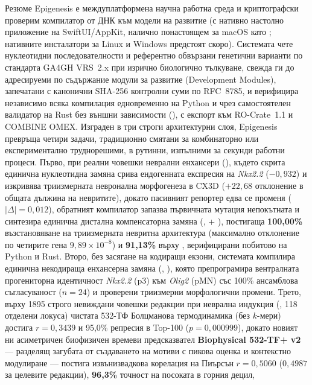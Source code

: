 \documentclass[10.5pt,a4paper]{article}
\begin{document}

\begin{abstractbox}{Резюме}
Epigenesis е междуплатформена научна работна среда и криптографски проверим компилатор от ДНК към модели на развитие (с нативно настолно приложение на SwiftUI/AppKit, налично понастоящем за macOS като ; нативните инсталатори за Linux и Windows предстоят скоро\texttrademark). Системата чете нуклеотидни последователности и референтно обвързани генетични варианти по стандарта GA4GH VRS~2.x при изрично биологично тълкуване, свежда ги до адресируеми по съдържание модули за развитие (Development Modules), запечатани с канонични SHA-256 контролни суми по RFC~8785, и верифицира независимо всяка компилация едновременно на Python и чрез самостоятелен валидатор на Rust без външни зависимости (), с експорт към RO-Crate~1.1 и COMBINE OMEX. Изграден в три строги архитектурни слоя, Epigenesis превръща четири задачи, традиционно смятани за комбинаторно или експериментално труднорешими, в рутинни, изпълними за секунди работни процеси. Първо, при реални човешки неврални енхансери (), където скрита единична нуклеотидна замяна срива ендогенната експресия на \emph{Nkx2.2} ($-0{,}932$) и изкривява триизмерната невронална морфогенеза в CX3D ($+22{,}68$ отклонение в общата дължина на невритите), докато пасивният репортер едва се променя ($|\Delta|=0{,}012$), обратният компилатор запазва първичната мутация непокътната и синтезира единична дистална компенсаторна замяна (,  + ), постигаща \textbf{100,00\%} възстановяване на триизмерната невритна архитектура (максимално отклонение по четирите гена $9{,}89\times10^{-8}$) и \textbf{91,13\%} върху , верифицирани побитово на Python и Rust. Второ, без засягане на кодиращи екзони, системата компилира единична некодираща енхансерна замяна (, ), която препрограмира вентралната прогениторна идентичност \emph{Nkx2.2} (p3) към \emph{Olig2} (pMN) със 100\% ансамблова съгласуваност ($n=24$) и проверени триизмерни морфологични промени. Трето, върху 1895 строго невиждани човешки редакции при неврална индукция (, 118 отделени локуса) чистата 532-ТФ Болцманова термодинамика (без $k$-мери) достига $r=0{,}3439$ и 95,0\% репресия в Top-100 ($p=0{,}000999$), докато новият ни асиметричен биофизичен времеви предсказвател \textbf{Biophysical 532-TF+ v2} — разделящ загубата от създаването на мотиви с пикова оценка и контекстно модулиране — постига извънизвадкова корелация на Пиърсън \textbf{$r=0{,}5060$} ($0{,}4987$ за целевите редакции), \textbf{96,3\%} точност на посоката в горния децил, 
\end{abstractbox}
\end{document}
